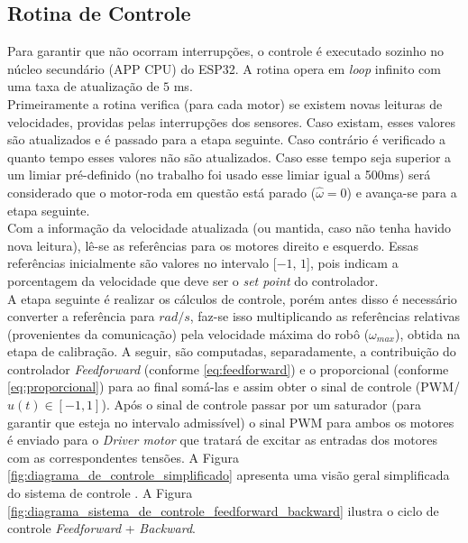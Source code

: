 \subsection{Rotina de Controle}
\label{subsec:rotina_controle}
Para garantir que não ocorram interrupções, o controle é executado sozinho no núcleo secundário (APP CPU) do ESP32. A rotina opera em \emph{loop} infinito com uma taxa de atualização de $5$ ms.\\

Primeiramente a rotina verifica (para cada motor) se existem novas leituras de velocidades, providas pelas interrupções dos sensores. Caso existam, esses valores são atualizados e é passado para a etapa seguinte. Caso contrário é verificado a quanto tempo esses valores não são atualizados. Caso esse tempo seja superior a um limiar pré-definido (no trabalho foi usado esse limiar igual a 500ms) será considerado que o motor-roda em questão está parado ($\hat{\omega} = 0$) e avança-se para a etapa seguinte.\\

Com a informação da velocidade atualizada (ou mantida, caso não tenha havido nova leitura), lê-se as referências para os motores direito e esquerdo. Essas referências inicialmente são valores no intervalo [$-1$, $1$], pois indicam a porcentagem da velocidade que deve ser o \emph{set point} do controlador. \\

A etapa seguinte é realizar os cálculos de controle, porém antes disso é necessário converter a referência para $rad/s$, faz-se isso multiplicando as referências relativas (provenientes da comunicação) pela velocidade máxima do robô ($\omega_{max}$), obtida na etapa de calibração. A seguir, são computadas, separadamente, a contribuição do controlador \emph{Feedforward} (conforme \ref{eq:feedforward}) e o proporcional (conforme \ref{eq:proporcional}) para ao final somá-las e assim obter o sinal de controle (PWM/$u(t) \in [-1,1]$). Após o sinal de controle passar por um saturador (para garantir que esteja no intervalo admissível) o sinal PWM para ambos os motores é enviado para o \emph{Driver motor} que tratará de excitar as entradas dos motores com as correspondentes tensões. A Figura \ref{fig:diagrama_de_controle_simplificado} apresenta uma visão geral simplificada do sistema de controle . A Figura \ref{fig:diagrama_sistema_de_controle_feedforward_backward} ilustra o ciclo de controle \emph{Feedforward} + \emph{Backward}.

